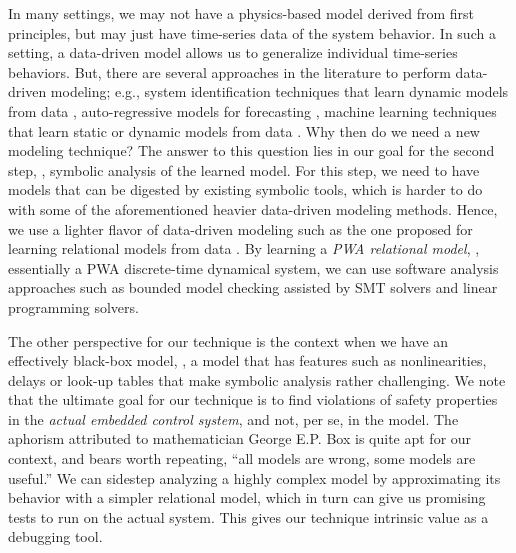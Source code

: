In many settings, we may not have a physics-based model derived from
first principles, but may just have time-series data of the system
behavior. In such a setting, a data-driven model allows us to
generalize individual time-series behaviors. But, there are several
approaches in the literature to perform data-driven modeling; e.g.,
system identification techniques that learn dynamic models from data
\cite{ljung1999system}, auto-regressive models for forecasting
\cite{wei1994time}, machine learning techniques that learn static or
dynamic models from data
\cite{narendra1990identification,lu2009linear}.  Why then do we need a
new modeling technique? The answer to this question lies in our goal
for the second step, \ie, symbolic analysis of the learned model. For
this step, we need to have models that can be digested by existing
symbolic tools, which is harder to do with some of the aforementioned
heavier data-driven modeling methods. Hence, we use a lighter flavor
of data-driven modeling such as the one proposed for learning
relational models from data
\cite{zutshi2012timed,sankaranarayanan2011relational}. By learning a
{\em PWA relational model}, \ie, essentially a PWA discrete-time
dynamical system, we can use software analysis approaches such as
bounded model checking assisted by SMT solvers and linear programming
solvers.

The other perspective for our technique is the context when we have an
effectively black-box model, \ie, a model that has features such as
nonlinearities, delays or look-up tables that make symbolic analysis
rather challenging.  We note that the ultimate goal for our technique
is to find violations of safety properties in the {\em actual embedded
control system}, and not, per se, in the model. The aphorism
attributed to mathematician George E.P. Box is quite apt for our
context, and bears worth repeating,  ``all models are wrong, some
models are useful.'' We can sidestep analyzing a highly complex model
by approximating its behavior with a simpler relational model, which
in turn can give us promising tests to run on the actual system. This
gives our technique intrinsic value as a debugging tool.


